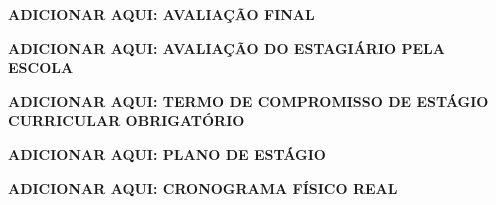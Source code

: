 \begin{center}
\vspace*{\fill}
\textbf{ADICIONAR AQUI: AVALIAÇÃO FINAL}\\
\vfill
\end{center}
\pagebreak

\begin{center}
\vspace*{\fill}
\textbf{ADICIONAR AQUI: AVALIAÇÃO DO ESTAGIÁRIO PELA ESCOLA}\\
\vfill
\end{center}
\pagebreak
\begin{center}
\vspace*{\fill}
\textbf{ADICIONAR AQUI: TERMO DE COMPROMISSO DE ESTÁGIO CURRICULAR OBRIGATÓRIO}\\
\vfill
\end{center}
\pagebreak
\begin{center}
\vspace*{\fill}
\textbf{ADICIONAR AQUI: PLANO DE ESTÁGIO}\\
\vfill
\end{center}
\pagebreak
\begin{center}
\vspace*{\fill}
\textbf{ADICIONAR AQUI: CRONOGRAMA FÍSICO REAL}\\
\vfill
\end{center}


\pagebreak


